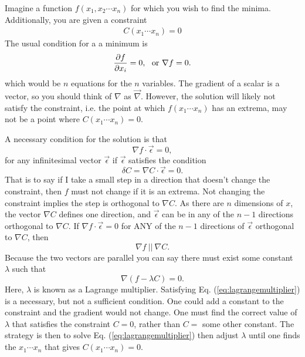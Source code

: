 Imagine a function $f(x_1,x_2\cdots x_n)$ for which you wish to find
the minima. Additionally, you are given a constraint
\begin{eqnarray}
C(x_1\cdots x_n)=0
\end{eqnarray}
The usual condition for a a minimum is
\begin{eqnarray}
\frac{\partial f}{\partial x_i}=0{\rm ,~~or~}\nabla f=0.
\end{eqnarray}
which would be $n$ equations for the $n$ variables. The gradient of a
scalar is a vector, so you should think of $\nabla$ as
$\vec{\nabla}$. However, the solution will likely not satisfy the
constraint, i.e. the point at which $f(x_1\cdots x_n)$ has an extrema,
may not be a point where $C(x_1\cdots x_n)=0$.

A necessary condition for the solution is that
\begin{equation}
\nabla f\cdot\vec{\epsilon}=0,
\end{equation}
for any infinitesimal vector $\vec{\epsilon}$ if $\vec{\epsilon}$
satisfies the condition
\begin{equation}
\delta C=\nabla C\cdot\vec{\epsilon}=0.
\end{equation}
That is to say if I take a small step in a direction that doesn't
change the constraint, then $f$ must not change if it is an
extrema. Not changing the constraint implies the step is orthogonal to
$\nabla C$. As there are $n$ dimensions of $x$, the vector $\nabla C$
defines one direction, and $\vec{\epsilon}$ can be in any of the $n-1$
directions orthogonal to $\nabla C$. If $\nabla
f\cdot\vec{\epsilon}=0$ for ANY of the $n-1$ directions of
$\vec{\epsilon}$ orthogonal to $\nabla C$, then
\begin{equation}
\nabla f ~||~ \nabla C.
\end{equation}
Because the two vectors are parallel you can say there must exist some
constant $\lambda$ such that
\begin{equation}
\label{eq:lagrangemultiplier}
\nabla(f-\lambda C)=0.
\end{equation}
Here, $\lambda$ is known as a Lagrange multiplier. Satisfying
Eq. (\ref{eq:lagrangemultiplier}) is a necessary, but not a sufficient
condition. One could add a constant to the constraint and the gradient
would not change. One must find the correct value of $\lambda$ that
satisfies the constraint $C=0$, rather than $C=$ some other
constant. The strategy is then to solve
Eq. (\ref{eq:lagrangemultiplier}) then adjust $\lambda$ until one
finds the $x_1\cdots x_n$ that gives $C(x_1\cdots x_n)=0$.

